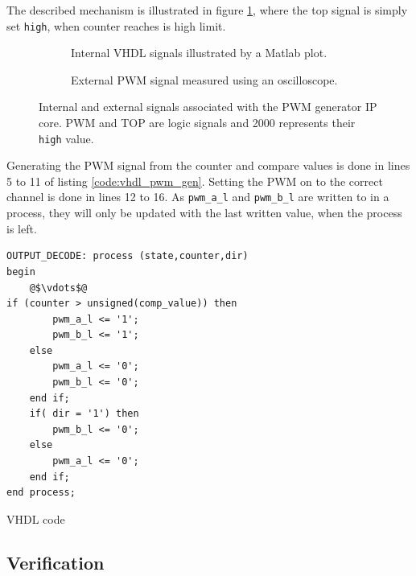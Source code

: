 The described mechanism is illustrated in figure \ref{sfig:pwm_gen_int}, where the top signal is simply set \texttt{high}, when counter reaches is high limit.

\begin{figure}
    \centering
    \begin{subfigure}[b]{0.45\textwidth}
        
        \caption{Internal VHDL signals illustrated by a Matlab plot.}
        \label{sfig:pwm_gen_int}
    \end{subfigure}
    \begin{subfigure}[b]{0.45\textwidth}
        
        \caption{External PWM signal measured using an oscilloscope. }
        \label{sfig:pwm_gen_ext}
    \end{subfigure}
    \caption[Signals associated with the PWM generator IP core]{Internal and external signals associated with the PWM generator IP core. PWM and TOP are logic signals and 2000 represents their \texttt{high} value.}
    \label{fig:vhdl_pwm_gen}
\end{figure}

Generating the PWM signal from the counter and compare values is done in lines 5 to 11 of listing \ref{code:vhdl_pwm_gen}.
Setting the PWM on to the correct channel is done in lines 12 to 16.
As \texttt{pwm\_a\_l} and \texttt{pwm\_b\_l} are written to in a process, they will only be updated with the last written value, when the process is left.

\begin{listing}[h]
\begin{verbatim}
OUTPUT_DECODE: process (state,counter,dir)
begin
	@$\vdots$@
if (counter > unsigned(comp_value)) then
		pwm_a_l <= '1';
		pwm_b_l <= '1';
	else
		pwm_a_l <= '0';
		pwm_b_l <= '0';
	end if;	
	if( dir = '1') then 
		pwm_b_l <= '0';
	else 
		pwm_a_l <= '0';	
	end if;
end process;		
\end{verbatim}
\caption{VHDL code }
\label{code:vhdl_pwm_gen}
\end{listing}

	

\subsection{Verification} %
\label{sub:verification}
